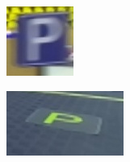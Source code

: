 \begin{figure}[h]
  \begin{subfigure}[b]{0.15\linewidth}
    \includegraphics[width=\linewidth]{figures/signs/Parking.jpg}
    \caption{}
  \end{subfigure}
  \begin{subfigure}[b]{0.15\linewidth}
    \includegraphics[width=\linewidth]{figures/signs/ParkingSlot.jpg}
    \caption{}
  \end{subfigure}
  \begin{subfigure}[b]{0.15\linewidth}

\end{subfigure}
\end{figure}
